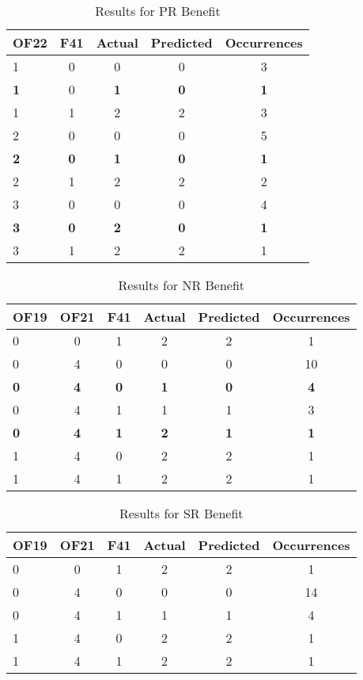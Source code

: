 \begin{table}[htbp]
\centering
\begin{tabular}{|l|c|c|c|c|}
\hline
OF22 & F41 & Actual & Predicted & Occurrences \\
\hline
1 & 0 & 0 & 0 & 3 \\
\textbf{1} & 0 & \textbf{1} & \textbf{0} & \textbf{1} \\
1 & 1 & 2 & 2 & 3 \\
2 & 0 & 0 & 0 & 5 \\
\textbf{2} & \textbf{0} & \textbf{1} & \textbf{0} & \textbf{1} \\
2 & 1 & 2 & 2 & 2 \\
3 & 0 & 0 & 0 & 4 \\
\textbf{3} & \textbf{0} & \textbf{2} & \textbf{0} & \textbf{1} \\
3 & 1 & 2 & 2 & 1 \\
\hline
\end{tabular}
\caption{Results for PR Benefit}
\label{tab_analysis:PR_Benefit_results}
\end{table}

\begin{table}[htbp]
\centering
\begin{tabular}{|l|c|c|c|c|c|}
\hline
OF19 & OF21 & F41 & Actual & Predicted & Occurrences \\
\hline
0 & 0 & 1 & 2 & 2 & 1 \\
0 & 4 & 0 & 0 & 0 & 10 \\
\textbf{0} & \textbf{4} & \textbf{0} & \textbf{1} & \textbf{0} & \textbf{4} \\
0 & 4 & 1 & 1 & 1 & 3 \\
\textbf{0} & \textbf{4} & \textbf{1} & \textbf{2} & \textbf{1} & \textbf{1} \\
1 & 4 & 0 & 2 & 2 & 1 \\
1 & 4 & 1 & 2 & 2 & 1 \\
\hline
\end{tabular}
\caption{Results for NR Benefit}
\label{tab_analysis:NR_Benefit_results}
\end{table}

\begin{table}[htbp]
\centering
\begin{tabular}{|l|c|c|c|c|c|}
\hline
OF19 & OF21 & F41 & Actual & Predicted & Occurrences \\
\hline
0 & 0 & 1 & 2 & 2 & 1 \\
0 & 4 & 0 & 0 & 0 & 14 \\
0 & 4 & 1 & 1 & 1 & 4 \\
1 & 4 & 0 & 2 & 2 & 1 \\
1 & 4 & 1 & 2 & 2 & 1 \\
\hline
\end{tabular}
\caption{Results for SR Benefit}
\label{tab_analysis:SR_Benefit_results}
\end{table}


